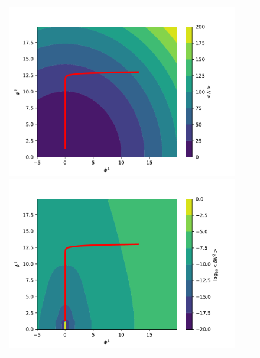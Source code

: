\documentclass[aps, prd
, preprint
, nofootinbib 
, notitlepage
, superscriptaddress
, longbibliography
]{revtex4-1}
\begin{document}
\begin{figure}
	\centering
	\begin{tabular}{ccc}
		\begin{minipage}{0.33\hsize}
			\centering
			\includegraphics[width=\hsize]{figs/N_double_chaotic_conf.pdf}
		\end{minipage}
		\begin{minipage}{0.33\hsize}
			\centering
			\includegraphics[width=\hsize]{figs/dN2_double_chaotic_conf.pdf}
		\end{minipage}
		\begin{minipage}{0.33\hsize}
			\centering

\end{minipage}
\end{tabular}
\end{figure}
\end{document}
